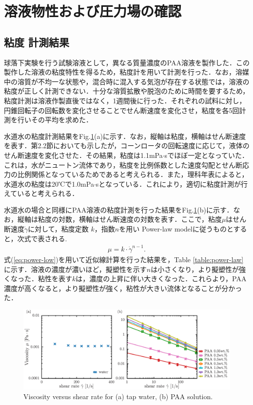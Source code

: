 \section{溶液物性および圧力場の確認}
\subsection{粘度 計測結果}
球落下実験を行う試験溶液として，異なる質量濃度のPAA溶液を製作した．この製作した溶液の粘度特性を得るため，粘度計を用いて計測を行った．なお，溶媒中の溶質が不均一な状態や，混合時に混入する気泡が存在する状態では，溶液の粘度が正しく計測できない．十分な溶質拡散や脱泡のために時間を要するため，粘度計測は溶液作製直後ではなく，1週間後に行った．それぞれの試料に対し，円錐回転子の回転数を変化させることでせん断速度を変化させ，粘度を各5回計測を行いその平均を求めた．

水道水の粘度計測結果をFig.\ref{fig:vis}(a)に示す．なお，縦軸は粘度，横軸はせん断速度を表す．第2.2節においても示したが，コーンロータの回転速度に応じて，液体のせん断速度を変化させた．その結果，粘度は1.1mPa$\cdot$sでほぼ一定となっていた．これは，水がニュートン流体であり，粘度を比例係数とした速度勾配とせん断応力の比例関係となっているためであると考えられる．また，理科年表\cite{理科年表}によると，水道水の粘度は20℃で1.0mPa$\cdot$sとなっている．これにより，適切に粘度計測が行えていると考えられる．

水道水の場合と同様にPAA溶液の粘度計測を行った結果をFig.\ref{fig:vis}(b)に示す．なお，縦軸は粘度の対数，横軸はせん断速度の対数を表す．ここで，粘度$\mu$はせん断速度$\dot{\gamma}$に対して，粘度定数 $k$，指数$n$を用い Power-law modelに従うものとすると，次式で表される\cite{ref:1}.
\begin{eqnarray}
	\label{eq:power-low}
	\mu=k\cdot\dot{\gamma}^{n-1}.
\end{eqnarray}
式(\ref{eq:power-low})を用いて近似線計算を行った結果を，Table \ref{table:power-law}に示す．溶液の濃度が濃いほど，擬塑性を示す$n$は小さくなり，より擬塑性が強くなった．粘性を表す$k$は，濃度の上昇に伴い大きくなった．これらより，PAA濃度が高くなると，より擬塑性が強く，粘性が大きい流体となることが分かった．

\begin{figure}[ht]
	\centering
	\includegraphics[width=15cm,clip]{3-Physical_Property/viscosity.eps}
	\caption{Viscosity versus shear rate for (a) tap water, (b) PAA solution.}
	\label{fig:vis}
\end{figure}


